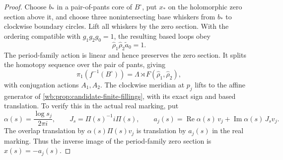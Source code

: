 \begin{proof}
Choose \(b_*\) in a pair-of-pants core of \(B^\circ\), put \(x_*\) on the
holomorphic zero section above it, and choose three nonintersecting base
whiskers from \(b_*\) to clockwise boundary circles.  Lift all whiskers by
the zero section.  With the ordering compatible with \(g_1g_2g_0=1\), the
resulting based loops obey
\[
 \widehat\rho_1\widehat\rho_2\widetilde a_0=1.
\tag{IL.5.23a}
\]
The period-family action is linear and hence preserves the zero section.
It splits the homotopy sequence over the pair of pants, giving
\[
 \pi_1(f^{-1}(B^\circ))=
 \Lambda\rtimes F(\widehat\rho_1,\widehat\rho_2),
\]
with conjugation actions \(A_1,A_2\).  The clockwise meridian at
\(p_j\) lifts to the affine generator of \cref{wb:prop:candidate-finite-fillings}, with its exact
sign and based translation.  To verify this in the actual
real marking, put
\[
 \alpha(s)=\frac{\log s_j}{2\pi i},\qquad
 J_s=\Pi(s)^{-1}i\Pi(s),\qquad
 a_j(s)=\operatorname{Re}\alpha(s)\,v_j+
        \operatorname{Im}\alpha(s)\,J_s v_j.
\]
The overlap translation by
\(\alpha(s)\Pi(s)v_j\) is translation by \(a_j(s)\) in the real
marking.  Thus the inverse image of the period-family zero section
is \(x(s)=-a_j(s)\).


\end{proof}
